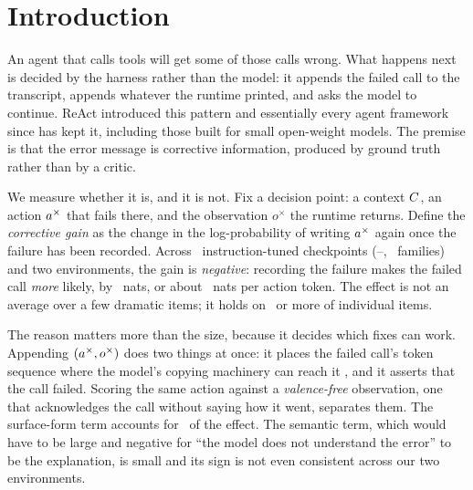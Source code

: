 \section{Introduction}
\label{sec:ws-intro}

An agent that calls tools will get some of those calls wrong. What happens next
is decided by the harness rather than the model: it appends the failed call to
the transcript, appends whatever the runtime printed, and asks the model to
continue. ReAct \citep{yao2023react} introduced this pattern and essentially
every agent framework since has kept it, including those built for small
open-weight models. The premise is that the error message is corrective
information, produced by ground truth rather than by a critic.

We measure whether it is, and it is not. Fix a decision point: a context
$C$, an action $a^{\times}$ that fails there, and the observation
$o^{\times}$ the runtime returns. Define the \emph{corrective gain} as the
change in the log-probability of writing $a^{\times}$ again once the failure has
been recorded. Across \NumModelsToolshed\ instruction-tuned checkpoints
(\SmallestModel--\LargestModel, \NumFamilies\ families) and two environments,
the gain is \emph{negative}: recording the failure makes the failed call
\emph{more} likely, by \MeanG\ nats, or about \GPerTokenTool\ nats per action
token. The effect is not an average over a few dramatic items; it holds on
\FracNegTool\ or more of individual items.

The reason matters more than the size, because it decides which fixes can
work. Appending $(a^{\times}, o^{\times})$ does two things at once: it places the
failed call's token sequence where the model's copying machinery can reach it
\citep{olsson2022induction,xu2022breaktheloop}, and it asserts that the call
failed. Scoring the same action against a \emph{valence-free} observation, one
that acknowledges the call without saying how it went, separates them. The
surface-form term accounts for \CopyShare\ of the effect. The semantic term,
which would have to be large and negative for ``the model does not understand
the error'' to be the explanation, is small and its sign is not even consistent
across our two environments.

